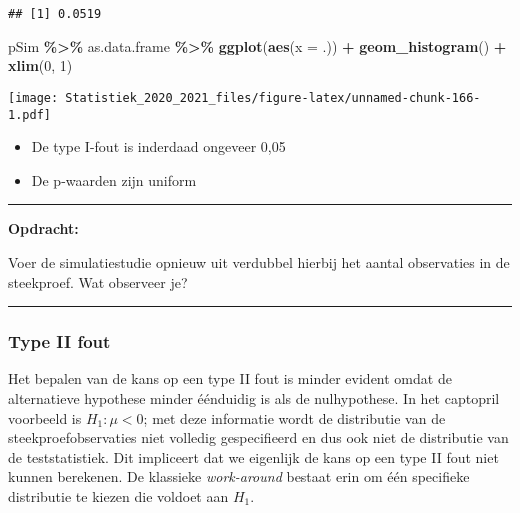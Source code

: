 \documentclass[
  12pt,dutch,coursenotes]{book}
\newenvironment{Shaded}{\begin{snugshade}}{\end{snugshade}}
\newcommand{\DataTypeTok}[1]{\textcolor[rgb]{0.13,0.29,0.53}{#1}}
\newcommand{\DecValTok}[1]{\textcolor[rgb]{0.00,0.00,0.81}{#1}}
\newcommand{\KeywordTok}[1]{\textcolor[rgb]{0.13,0.29,0.53}{\textbf{#1}}}
\newcommand{\NormalTok}[1]{#1}
\newcommand{\OperatorTok}[1]{\textcolor[rgb]{0.81,0.36,0.00}{\textbf{#1}}}
\newcommand{\StringTok}[1]{\textcolor[rgb]{0.31,0.60,0.02}{#1}}
\providecommand{\tightlist}{%
  \setlength{\itemsep}{0pt}\setlength{\parskip}{0pt}}
\theoremstyle{definition}
\theoremstyle{definition}
\theoremstyle{definition}
\theoremstyle{remark}
\begin{document}
\begin{verbatim}
## [1] 0.0519
\end{verbatim}

\begin{Shaded}
\begin{Highlighting}[]
\NormalTok{pSim }\OperatorTok{\%\textgreater{}\%}\StringTok{ }\NormalTok{as.data.frame }\OperatorTok{\%\textgreater{}\%}\StringTok{ }\KeywordTok{ggplot}\NormalTok{(}\KeywordTok{aes}\NormalTok{(}\DataTypeTok{x =}\NormalTok{ .)) }\OperatorTok{+}\StringTok{ }\KeywordTok{geom\_histogram}\NormalTok{() }\OperatorTok{+}\StringTok{ }
\StringTok{    }\KeywordTok{xlim}\NormalTok{(}\DecValTok{0}\NormalTok{, }\DecValTok{1}\NormalTok{)}
\end{Highlighting}
\end{Shaded}

\texttt{[image: Statistiek\_2020\_2021\_files/figure-latex/unnamed-chunk-166-1.pdf]}

\begin{itemize}
\tightlist
\item
  De type I-fout is inderdaad ongeveer 0,05
\item
  De p-waarden zijn uniform
\end{itemize}

\begin{center}\rule{0.5\linewidth}{0.5pt}\end{center}

\textbf{Opdracht:}

Voer de simulatiestudie opnieuw uit verdubbel hierbij het aantal observaties in de steekproef. Wat observeer je?

\begin{center}\rule{0.5\linewidth}{0.5pt}\end{center}

\hypertarget{type-ii-fout}{%
\subsubsection{Type II fout}\label{type-ii-fout}}

Het bepalen van de kans op een type II fout is minder evident omdat de alternatieve hypothese minder éénduidig is als de nulhypothese. In het captopril voorbeeld is \(H_1: \mu<0\); met deze informatie wordt de distributie van de steekproefobservaties niet volledig gespecifieerd en dus ook niet de distributie van de teststatistiek. Dit impliceert dat we eigenlijk de kans op een type II fout niet kunnen berekenen. De klassieke \emph{work-around} bestaat erin om één specifieke distributie te kiezen die voldoet aan \(H_1\).
\end{document}
